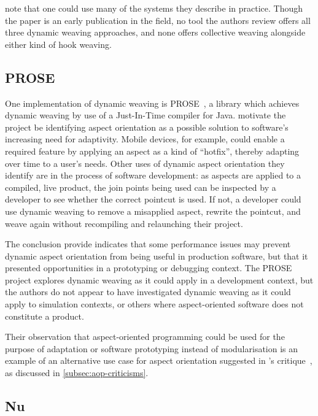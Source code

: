 \citeauthor{dynamicAOchitchyan} note that one could use many of
the systems they describe in practice. Though the paper is an early publication
in the field, no tool the authors review offers all three dynamic weaving
approaches, and none offers collective weaving alongside either kind of hook
weaving.


\subsection{PROSE}

One implementation of dynamic weaving is
PROSE~\cite{popovici2002PROSE,popovici2003JITaspects}, a library which achieves
dynamic weaving by use of a Just-In-Time compiler for Java.
\citeauthor{popovici2002PROSE} motivate the project be identifying aspect
orientation as a possible solution to software's increasing need for
adaptivity.
Mobile devices, for example, could enable a required feature by applying an
aspect as a kind of ``hotfix'', thereby adapting over time to a user's needs.
Other uses of dynamic aspect orientation they identify are in the process of
software development: as aspects are applied to a compiled, live product, the
join points being used can be inspected by a developer to see whether the
correct pointcut is used. If not, a developer could use dynamic weaving to
remove a misapplied aspect, rewrite the pointcut, and weave again without
recompiling and relaunching their project.

The conclusion \citet{popovici2003JITaspects} provide indicates that some
performance issues may prevent dynamic aspect orientation from being useful in
production software, but that it presented opportunities in a prototyping or
debugging context. The PROSE project explores dynamic weaving as it could apply
in a development context, but the authors do not appear to have investigated
dynamic weaving as it could apply to simulation contexts, or others where
aspect-oriented software does not constitute a product.

Their observation that aspect-oriented programming could be
used for the purpose of adaptation or software prototyping instead of
modularisation is an example of an alternative use case for aspect orientation
suggested in \citeauthor{steimann06paradoxical}'s
critique~\cite{steimann06paradoxical}, as discussed in
\cref{subsec:aop-criticisms}.



\subsection{Nu}

